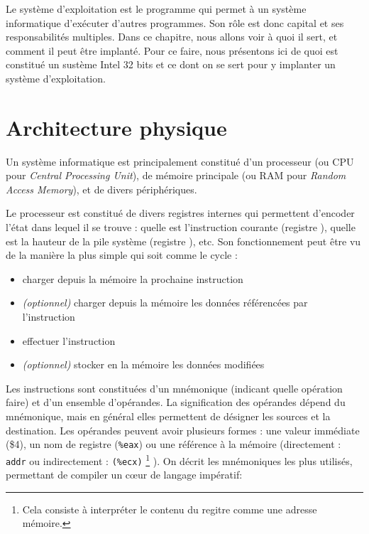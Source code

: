 Le système d'exploitation est le programme qui permet à un système informatique
d'exécuter d'autres programmes. Son rôle est donc capital et ses responsabilités
multiples. Dans ce chapitre, nous allons voir à quoi il sert, et comment il peut
être implanté. Pour ce faire, nous présentons ici de quoi est constitué un
sustème Intel 32 bits et ce dont on se sert pour y implanter un système
d'exploitation.

\section{Architecture physique}

Un système informatique est principalement constitué d'un processeur (ou CPU
pour \emph{Central Processing Unit}), de mémoire principale (ou RAM pour
\emph{Random Access Memory}), et de divers périphériques.

Le processeur est constitué de divers registres internes qui permettent
d'encoder l'état dans lequel il se trouve : quelle est l'instruction courante
(registre \eip), quelle est la hauteur de la pile système (registre \esp), etc.
Son fonctionnement peut être vu de la manière la plus simple qui soit comme le
cycle :

\begin{itemize}
\item
  charger depuis la mémoire la prochaine instruction
\item
  \emph{(optionnel)} charger depuis la mémoire les données référencées
  par l'instruction
\item
  effectuer l'instruction
\item
  \emph{(optionnel)} stocker en la mémoire les données modifiées
\end{itemize}

Les instructions sont constituées d'un mnémonique (indicant quelle opération
faire) et d'un ensemble d'opérandes. La signification des opérandes dépend du
mnémonique, mais en général elles permettent de désigner les sources et la
destination. Les opérandes peuvent avoir plusieurs formes : une valeur
immédiate (\$4), un nom de registre (\texttt{\%eax}) ou une référence à la
mémoire (directement : \texttt{addr} ou indirectement : \texttt{(\%ecx)}
\footnote{
  Cela consiste à interpréter le contenu du regitre \ecx comme une adresse
  mémoire.
}
). On décrit les mnémoniques les plus utilisés, permettant de compiler un cœur
de langage impératif:

